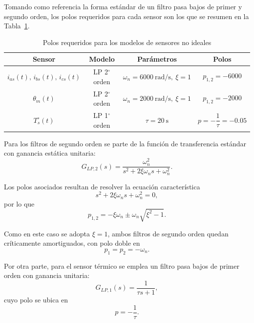 \documentclass[12pt, a4paper,journal, onecolumn, compsoc]{IEEEtran}
\begin{document}
Tomando como referencia la forma estándar de un filtro pasa bajos de primer y segundo orden, los polos requeridos para cada sensor son los que se resumen en la Tabla~\ref{tab:polos_sensores}.

\begin{table}[H]
    \centering
    \caption{Polos requeridos para los modelos de sensores no ideales}
    \label{tab:polos_sensores}
    \begin{tabular}{|c|c|c|c|}
        \hline
        \textbf{Sensor} & \textbf{Modelo} & \textbf{Parámetros} & \textbf{Polos} \\
        \hline
        $i_{as}(t),\,i_{bs}(t),\,i_{cs}(t)$ 
        & LP 2$^\circ$ orden 
        & $\omega_n=6000\ \text{rad/s},\ \xi=1$ 
        & $p_{1,2}=-6000$ \\
        \hline
        $\theta_m(t)$ 
        & LP 2$^\circ$ orden 
        & $\omega_n=2000\ \text{rad/s},\ \xi=1$ 
        & $p_{1,2}=-2000$ \\
        \hline
        $T_s^\circ(t)$ 
        & LP 1$^\circ$ orden 
        & $\tau=20\ \text{s}$ 
        & $p=-\dfrac{1}{\tau}=-0.05$ \\
        \hline
    \end{tabular}
\end{table}

Para los filtros de segundo orden se parte de la función de transferencia estándar con ganancia estática unitaria:
\begin{equation}
    G_{LP,2}(s)=\frac{\omega_n^2}{s^2+2\xi\omega_n s+\omega_n^2}.
    \label{eq:lp2_tf}
\end{equation}

Los polos asociados resultan de resolver la ecuación característica
\begin{equation}
    s^2+2\xi\omega_n s+\omega_n^2=0,
\end{equation}
por lo que
\begin{equation}
    p_{1,2}=-\xi\omega_n\pm\omega_n\sqrt{\xi^2-1}.
\end{equation}

Como en este caso se adopta $\xi=1$, ambos filtros de segundo orden quedan críticamente amortiguados, con polo doble en
\begin{equation}
    p_1=p_2=-\omega_n.
\end{equation}

Por otra parte, para el sensor térmico se emplea un filtro pasa bajos de primer orden con ganancia unitaria:
\begin{equation}
    G_{LP,1}(s)=\frac{1}{\tau s+1},
    \label{eq:lp1_tf}
\end{equation}
cuyo polo se ubica en
\begin{equation}
    p=-\frac{1}{\tau}.
\end{equation}
\end{document}
